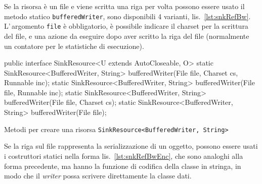 Se la risorsa è un file e viene scritta una riga per volta possono essere usato
il metodo statico \texttt{bufferedWriter}, sono disponibili 4 varianti,
lis.~\ref{lst:snkRefBw}. L'\,argomento \texttt{file} è obbligatorio, è possibile
indicare il charset per la scrittura del file, e una azione da eseguire dopo
aver scritto la riga del file (normalmente un contatore per le statistiche di
esecuzione).

\begin{elisting}[!htb]
    \begin{javacode}
        public interface SinkResource<U extends AutoCloseable, O> {
    static SinkResource<BufferedWriter, String> bufferedWriter(File file, Charset cs, Runnable inc);
    static SinkResource<BufferedWriter, String> bufferedWriter(File file, Runnable inc);
    static SinkResource<BufferedWriter, String> bufferedWriter(File file, Charset cs);
    static SinkResource<BufferedWriter, String> bufferedWriter(File file);
}
    \end{javacode}
    \caption{Metodi per creare una risorsa \texttt{SinkResource<BufferedWriter, String>}}
    \label{lst:snkRefBw}
\end{elisting}

Se la riga sul file rappresenta la serializzazione di un oggetto, possono essere
usati i costruttori statici nella forma lis.~\ref{lst:snkRefBwEnc}, che sono
analoghi alla forma precedente, ma hanno la funzione di codifica della classe
in stringa, in modo che il \textit{writer} possa scrivere direttamente la classe
dati.

